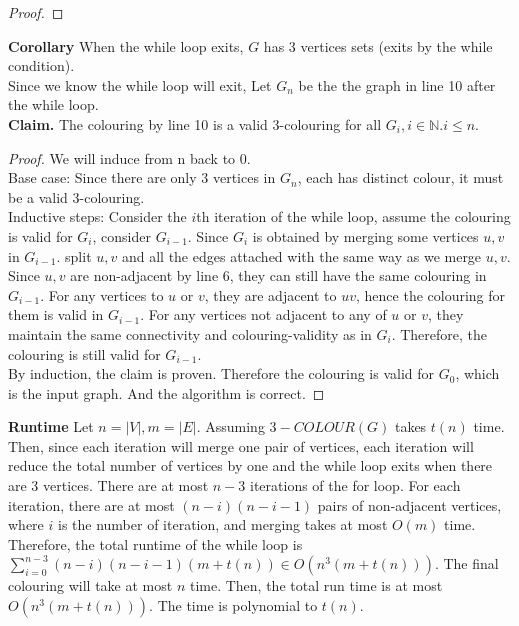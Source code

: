 \documentclass[11pt]{article}
\begin{document}
\begin{enumerate}
\begin{proof}
    \end{proof}
    \textbf{Corollary} When the while loop exits, $G$ has 3 vertices sets (exits by the while condition). \\
    Since we know the while loop will exit, Let $G_n$ be the the graph in line 10 after the while loop. \\
    \textbf{Claim.} The colouring by line 10 is a valid 3-colouring for all $G_{i}, i\in\mathbb{N}. i\leq n$.
    \begin{proof} 
    We will induce from n back to 0. \\
    Base case: Since there are only $3$ vertices in $G_n$, each has distinct colour, it must be a valid 3-colouring. \\
    Inductive steps: Consider the $i$th iteration of the while loop, assume the colouring is valid for $G_i$, consider $G_{i-1}$. Since $G_{i}$ is obtained by merging some vertices $u, v$ in $G_{i-1}$. split $u,v$ and all the edges attached with the same way as we merge $u,v$. Since $u,v$ are non-adjacent by line 6, they can still have the same colouring in $G_{i-1}$. For any vertices to $u$ or $v$, they are adjacent to $uv$, hence the colouring for them is valid in $G_{i-1}$. For any vertices not adjacent to any of $u$ or $v$, they maintain the same connectivity and colouring-validity as in $G_{i}$. Therefore, the colouring is still valid for $G_{i-1}$.\\
    By induction, the claim is proven. Therefore the colouring is valid for $G_0$, which is the input graph. And the algorithm is correct. 
    \end{proof}
    
    
    
    
    \textbf{Runtime} Let $n=|V|, m=|E|$. 
    Assuming $3-COLOUR(G)$ takes $t(n)$ time. Then, since each iteration will merge one pair of vertices, each iteration will reduce the total number of vertices by one and the while loop exits when there are 3 vertices. There are at most $n-3$ iterations of the for loop. For each iteration, there are at most $(n-i)(n-i-1)$ pairs of non-adjacent vertices, where $i$ is the number of iteration, and merging takes at most $O(m)$ time. Therefore, the total runtime of the while loop is $\sum_{i=0}^{n-3} (n-i)(n-i-1)(m+t(n))\in O(n^3(m+t(n)))$. The final colouring will take at most $n$ time. Then, the total run time is at most $O(n^3(m+t(n)))$. The time is polynomial to $t(n)$. \\[2ex]
    
    
    

\end{enumerate}
\end{document}
